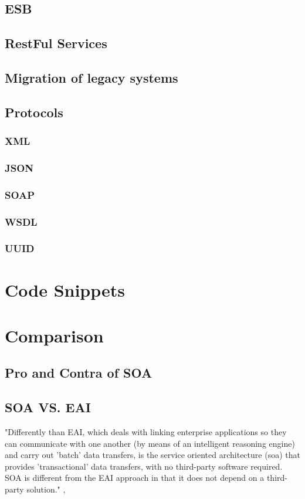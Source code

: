 \documentclass[12pt]{article}
\begin{document}
\subsection{ESB}
\label{sec:esb}
\subsection{RestFul Services}
\subsection{Migration of legacy systems}
\subsection{Protocols}
\subsubsection{XML}
\subsubsection{JSON}
\subsubsection{SOAP}
\subsubsection{WSDL}
\subsubsection{UUID}


\section{Code Snippets}
\section{Comparison}
\subsection{Pro and Contra of SOA}
\subsection{SOA VS. EAI}
"Differently than EAI, which deals with linking enterprise applications so they can communicate with one another (by means of an intelligent reasoning engine) and carry out 'batch' data transfers, is the service oriented architecture (\gls{soa}) that provides 'transactional' data transfers, with no third-party software required. SOA is different from the EAI approach in that it does not depend on a third-party solution." ,\cite{soadef}
\begin{figure}[here!]
	\centering
	\label{fig:eaipartofso}
	\end{figure}
\end{document}
